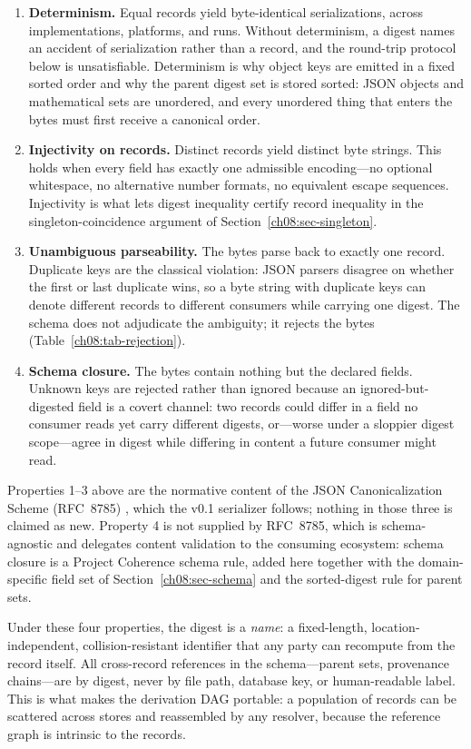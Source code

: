 \begin{enumerate}
\item \textbf{Determinism.} Equal records yield byte-identical serializations, across implementations, platforms, and runs. Without determinism, a digest names an accident of serialization rather than a record, and the round-trip protocol below is unsatisfiable. Determinism is why object keys are emitted in a fixed sorted order and why the parent digest set is stored sorted: JSON objects and mathematical sets are unordered, and every unordered thing that enters the bytes must first receive a canonical order.
\item \textbf{Injectivity on records.} Distinct records yield distinct byte strings. This holds when every field has exactly one admissible encoding---no optional whitespace, no alternative number formats, no equivalent escape sequences. Injectivity is what lets digest inequality certify record inequality in the singleton-coincidence argument of Section~\ref{ch08:sec-singleton}.
\item \textbf{Unambiguous parseability.} The bytes parse back to exactly one record. Duplicate keys are the classical violation: JSON parsers disagree on whether the first or last duplicate wins, so a byte string with duplicate keys can denote different records to different consumers while carrying one digest. The schema does not adjudicate the ambiguity; it rejects the bytes (Table~\ref{ch08:tab-rejection}).
\item \textbf{Schema closure.} The bytes contain nothing but the declared fields. Unknown keys are rejected rather than ignored because an ignored-but-digested field is a covert channel: two records could differ in a field no consumer reads yet carry different digests, or---worse under a sloppier digest scope---agree in digest while differing in content a future consumer might read.
\end{enumerate}

Properties 1--3 above are the normative content of the JSON Canonicalization Scheme (RFC~8785) \cite{jcs}, which the v0.1 serializer follows; nothing in those three is claimed as new. Property 4 is not supplied by RFC~8785, which is schema-agnostic and delegates content validation to the consuming ecosystem: schema closure is a Project Coherence schema rule, added here together with the domain-specific field set of Section~\ref{ch08:sec-schema} and the sorted-digest rule for parent sets.

\begin{remark}\label{ch08:rem-digest-names}
Under these four properties, the digest is a \emph{name}: a fixed-length, location-independent, collision-resistant identifier that any party can recompute from the record itself. All cross-record references in the schema---parent sets, provenance chains---are by digest, never by file path, database key, or human-readable label. This is what makes the derivation DAG portable: a population of records can be scattered across stores and reassembled by any resolver, because the reference graph is intrinsic to the records.
\end{remark}

